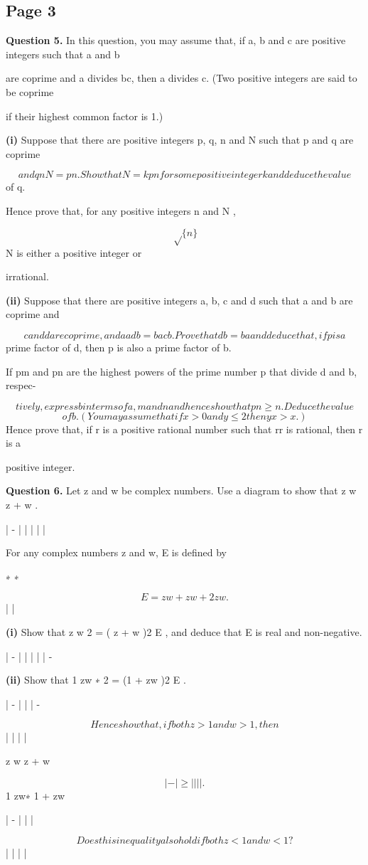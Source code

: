 \documentclass[12pt]{article}
\begin{document}
\subsection*{Page 3}
\begin{flushleft}
\bigskip\textbf{Question 5.} In this question, you may assume that, if a, b and c are positive integers such that a and b\par
are coprime and a divides bc, then a divides c. (Two positive integers are said to be coprime\par
if their highest common factor is 1.)\par
\textbf{(i)} Suppose that there are positive integers p, q, n and N such that p and q are coprime\par
\[and qnN = pn. Show that N = kpn for some positive integer k and deduce the value\]
of q.\par
Hence prove that, for any positive integers n and N ,\par
\[\sqrt\{n\}\]
N is either a positive integer or\par
irrational.\par
\textbf{(ii)} Suppose that there are positive integers a, b, c and d such that a and b are coprime and\par
\[c and d are coprime, and aadb = bacb . Prove that db = ba and deduce that, if p is a\]
prime factor of d, then p is also a prime factor of b.\par
If pm and pn are the highest powers of the prime number p that divide d and b, respec-\par
\[tively, express b in terms of a, m and n and hence show that pn \geq n. Deduce the value\]
\[of b. (You may assume that if x > 0 and y \leq 2 then yx > x.)\]
Hence prove that, if r is a positive rational number such that rr is rational, then r is a\par
positive integer.\par
\bigskip\textbf{Question 6.} Let z and w be complex numbers. Use a diagram to show that z w \geq z + w .\par
| - | | | | |\par
For any complex numbers z and w, E is defined by\par
∗ ∗\par
\[E = zw + z w + 2 zw .\]
| |\par
\textbf{(i)} Show that z w 2 = ( z + w )2 E , and deduce that E is real and non-negative.\par
| - | | | | | -\par
\textbf{(ii)} Show that 1 zw ∗ 2 = (1 + zw )2 E .\par
| - | | | -\par
\[Hence show that, if both z > 1 and w > 1, then\]
| | | |\par
z w z + w\par
\[| - | \geq | | | | .\]
1 zw∗ 1 + zw\par
| - | | |\par
\[Does this inequality also hold if both z < 1 and w < 1?\]
| | | |\par
\end{flushleft}
\end{document}
